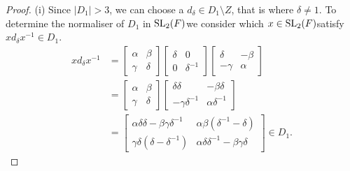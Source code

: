 \begin{proof} (i) Since $|D_1| > 3$, we can choose a $d_\delta \in D_1 \! \setminus \! Z$, that is where $\delta \neq 1$. To determine the normaliser of $D_1$ in $\operatorname{SL}_2(F)$we consider which $x \in \operatorname{SL}_2(F)$satisfy $x d_\delta x^{-1} \in D_1$.
\begin{align}\label{6.3proof3} xd_\delta x^{-1} &= \begin{bmatrix} \alpha & \beta \\ \gamma & \delta \end{bmatrix} \begin{bmatrix} \delta & 0 \\ 0 & \delta^{-1} \end{bmatrix} \begin{bmatrix} \delta & \minus \beta \\ \minus \gamma & \alpha \end{bmatrix} \nonumber \\[1.5ex]
&= \begin{bmatrix} \alpha & \beta \\ \gamma & \delta \end{bmatrix} \begin{bmatrix} \delta \delta & \minus \beta \delta \\ \minus \gamma \delta^{-1} & \alpha \delta^{-1} \end{bmatrix} \nonumber \\[1.5ex]
&= \begin{bmatrix} \alpha \delta \delta - \beta \gamma \delta^{-1} & \alpha \beta (\delta^{-1} - \delta) \\ \gamma \delta (\delta - \delta^{-1}) & \alpha \delta \delta^{-1} - \beta \gamma \delta \end{bmatrix} \in D_1.
\end{align}


\end{proof}
